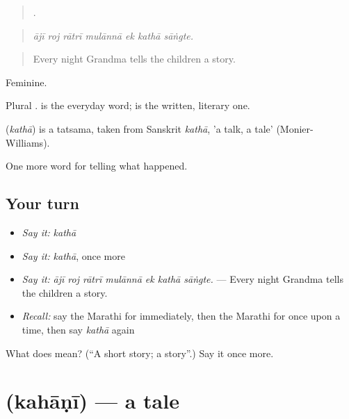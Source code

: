 \begin{quote}
      .
\end{quote}

\begin{quote}
\emph{ājī roj rātrī mulānnā ek kathā sāṅgte.}
\end{quote}

\begin{quote}
Every night Grandma tells the children a story.
\end{quote}

Feminine.

Plural .  is the everyday word;  is the written, literary one.

\begin{cousinweb}
\textbf{} (\emph{kathā}) is a tatsama, taken from Sanskrit \emph{kathā}, 'a talk, a tale' (Monier-Williams).
\end{cousinweb}

\begin{grammarlens}[title={What you've built}]
One more word for telling what happened.
\end{grammarlens}

\subsection*{Your turn}
\begin{itemize}
\raggedright
  \item \emph{Say it:} \emph{kathā}
  \item \emph{Say it:} \emph{kathā}, once more
  \item \emph{Say it:} \emph{ājī roj rātrī mulānnā ek kathā sāṅgte.} — Every night Grandma tells the children a story.
  \item \emph{Recall:} say the Marathi for immediately, then the Marathi for once upon a time, then say \emph{kathā} again
\end{itemize}

\begin{tcolorbox}[breakable,colback=teal!4,colframe=teal!35!black,title={Before you move on}]
What does  mean? (\textquotedblleft{}A short story; a story\textquotedblright{}.) Say it once more.
\end{tcolorbox}
\section[\texorpdfstring{\mr{कहाणी} (kahāṇī)}{कहाणी (kahāṇī)}]{ (kahāṇī) — a tale}

